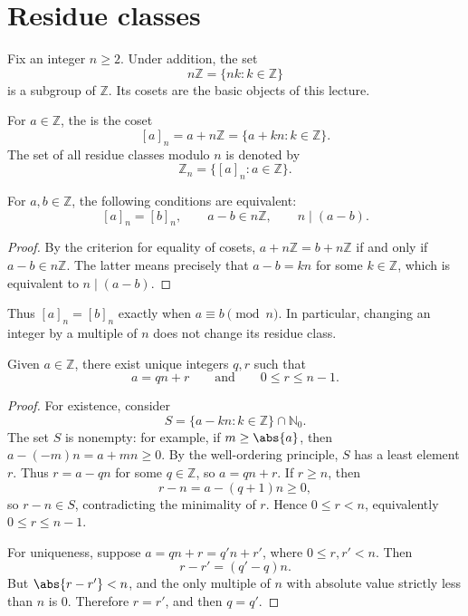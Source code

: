 
\section{Residue classes}

Fix an integer \(n \geq 2\). Under addition, the set
\[
	n\mathbb Z = \{nk : k \in \mathbb Z\}
\]
is a subgroup of \(\mathbb Z\). Its cosets are the basic objects of this lecture.

\begin{definition}
	For \(a \in \mathbb Z\), the  is the coset
	\[
		[a]_n = a+n\mathbb Z = \{a+kn : k \in \mathbb Z\}.
	\]
	The set of all residue classes modulo \(n\) is denoted by
	\[
		\mathbb Z_n = \{[a]_n : a \in \mathbb Z\}.
	\]
\end{definition}

\begin{proposition}\label{prop:residue-class-equality}
	For \(a,b \in \mathbb Z\), the following conditions are equivalent:
	\[
		[a]_n=[b]_n, \qquad a-b\in n\mathbb Z, \qquad n\mid(a-b).
	\]
\end{proposition}

\begin{proof}
	By the criterion for equality of cosets,
	\(a+n\mathbb Z=b+n\mathbb Z\) if and only if
	\(a-b\in n\mathbb Z\). The latter means precisely that \(a-b=kn\) for some
	\(k\in\mathbb Z\), which is equivalent to \(n\mid(a-b)\).
\end{proof}

Thus \([a]_n=[b]_n\) exactly when \(a\equiv b\pmod n\). In particular, changing an
integer by a multiple of \(n\) does not change its residue class.

\begin{proposition}\label{prop:division-algorithm}
	Given \(a\in\mathbb Z\), there exist unique integers \(q,r\) such that
	\[
		a=qn+r \qquad\text{and}\qquad 0\leq r\leq n-1.
	\]
\end{proposition}

\begin{proof}
	For existence, consider
	\[
		S=\{a-kn:k\in\mathbb Z\}\cap\mathbb N_0.
	\]
	The set \(S\) is nonempty: for example, if \(m\geq \abs{a}\), then
	\(a-(-m)n=a+mn\geq0\). By the well-ordering principle, \(S\) has a least element
	\(r\). Thus \(r=a-qn\) for some \(q\in\mathbb Z\), so \(a=qn+r\).
	If \(r\geq n\), then
	\[
		r-n=a-(q+1)n\geq0,
	\]
	so \(r-n\in S\), contradicting the minimality of \(r\). Hence
	\(0\leq r<n\), equivalently \(0\leq r\leq n-1\).

	For uniqueness, suppose
	\(a=qn+r=q'n+r'\), where \(0\leq r,r'<n\). Then
	\[
		r-r'=(q'-q)n.
	\]
	But \(\abs{r-r'}<n\), and the only multiple of \(n\) with absolute value strictly
	less than \(n\) is \(0\). Therefore \(r=r'\), and then \(q=q'\).
\end{proof}

